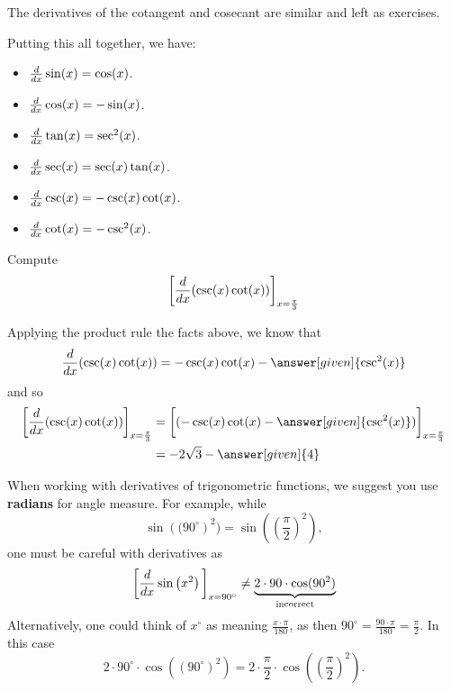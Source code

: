 \documentclass{ximera}
\begin{document}
The derivatives of the cotangent and cosecant are similar and left as
exercises. 

Putting this all together, we have:

\begin{theorem} \hfil
\begin{itemize}
\item $\frac{d}{dx} \sin(x) = \cos(x)$.
\item $\frac{d}{dx} \cos(x) = -\sin(x)$.
\item $\frac{d}{dx} \tan(x) = \sec^2(x)$.
\item $\frac{d}{dx} \sec(x) = \sec(x)\tan(x)$.
\item $\frac{d}{dx} \csc(x) = -\csc(x)\cot(x)$.
\item $\frac{d}{dx} \cot(x) = -\csc^2(x)$.
\end{itemize}
\end{theorem}

\begin{example}
Compute
\[
\bigg[ \frac{d}{dx} ( \csc(x) \cot(x) ) \bigg]_{x=\frac{\pi}{3}}
\]
\begin{explanation}
Applying the product rule the facts above, we know that
\[
\ddx ( \csc(x) \cot(x) ) = - \csc(x) \cot(x) - \answer[given]{\csc^2(x)}
\]
and so
\begin{align*}
\eval{\ddx ( \csc(x) \cot(x) )}_{x=\frac{\pi}{3}} &= \eval{ (- \csc(x) \cot(x) - \answer[given]{\csc^2(x)})}_{x=\frac{\pi}{3}}  \\
&= - 2 \sqrt{3} - \answer[given]{4}
\end{align*}
\end{explanation}
\end{example}


\begin{warning}
When working with derivatives of trigonometric functions, we suggest
you use \textbf{radians} for angle measure. For example, while
\[
\sin\left((90^\circ\right)^2) = \sin\left(\left(\frac{\pi}{2}\right)^2\right),
\]
one must be careful with derivatives as
\[
\bigg[ \frac{d}{dx} \sin\left(x^2\right) \bigg]_{x=90^\circ} \ne \underbrace{2\cdot 90\cdot \cos(90^2)}_{\text{incorrect}}
\]
Alternatively, one could think of $x^\circ$ as meaning
$\frac{x\cdot\pi}{180}$, as then $90^\circ = \frac{90\cdot\pi}{180} =
\frac{\pi}{2}$. In this case
\[
2\cdot 90^\circ\cdot \cos((90^\circ)^2) = 2\cdot \frac{\pi}{2}\cdot\cos\left(\left(\frac{\pi}{2}\right)^2\right).
\]
\end{warning}
\end{document}

